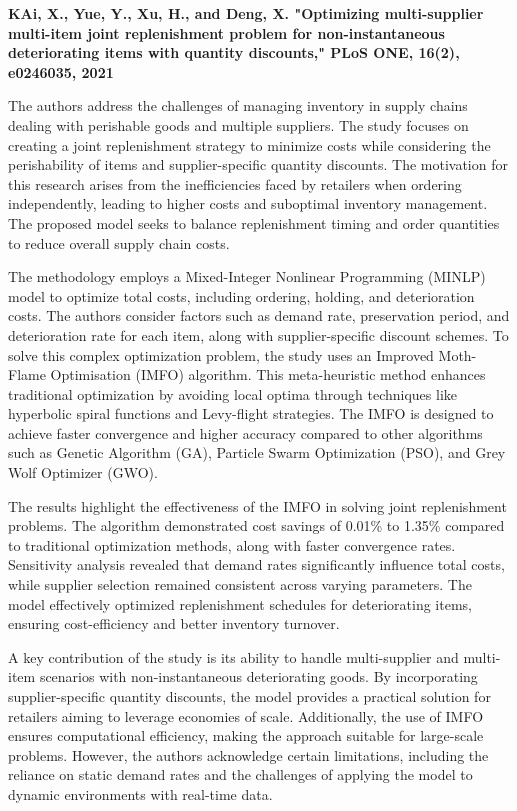 \textbf{\cite{ai2021multisupplier}KAi, X., Yue, Y., Xu, H., and Deng, X. "Optimizing multi-supplier multi-item joint replenishment problem for non-instantaneous deteriorating items with quantity discounts," PLoS ONE, 16(2), e0246035, 2021}

The authors address the challenges of managing inventory in supply chains dealing with perishable goods and multiple suppliers. The study focuses on creating a joint replenishment strategy to minimize costs while considering the perishability of items and supplier-specific quantity discounts. The motivation for this research arises from the inefficiencies faced by retailers when ordering independently, leading to higher costs and suboptimal inventory management. The proposed model seeks to balance replenishment timing and order quantities to reduce overall supply chain costs.

The methodology employs a Mixed-Integer Nonlinear Programming (MINLP) model to optimize total costs, including ordering, holding, and deterioration costs. The authors consider factors such as demand rate, preservation period, and deterioration rate for each item, along with supplier-specific discount schemes. To solve this complex optimization problem, the study uses an Improved Moth-Flame Optimisation (IMFO) algorithm. This meta-heuristic method enhances traditional optimization by avoiding local optima through techniques like hyperbolic spiral functions and Levy-flight strategies. The IMFO is designed to achieve faster convergence and higher accuracy compared to other algorithms such as Genetic Algorithm (GA), Particle Swarm Optimization (PSO), and Grey Wolf Optimizer (GWO).

The results highlight the effectiveness of the IMFO in solving joint replenishment problems. The algorithm demonstrated cost savings of 0.01\% to 1.35\% compared to traditional optimization methods, along with faster convergence rates. Sensitivity analysis revealed that demand rates significantly influence total costs, while supplier selection remained consistent across varying parameters. The model effectively optimized replenishment schedules for deteriorating items, ensuring cost-efficiency and better inventory turnover.

A key contribution of the study is its ability to handle multi-supplier and multi-item scenarios with non-instantaneous deteriorating goods. By incorporating supplier-specific quantity discounts, the model provides a practical solution for retailers aiming to leverage economies of scale. Additionally, the use of IMFO ensures computational efficiency, making the approach suitable for large-scale problems. However, the authors acknowledge certain limitations, including the reliance on static demand rates and the challenges of applying the model to dynamic environments with real-time data.

